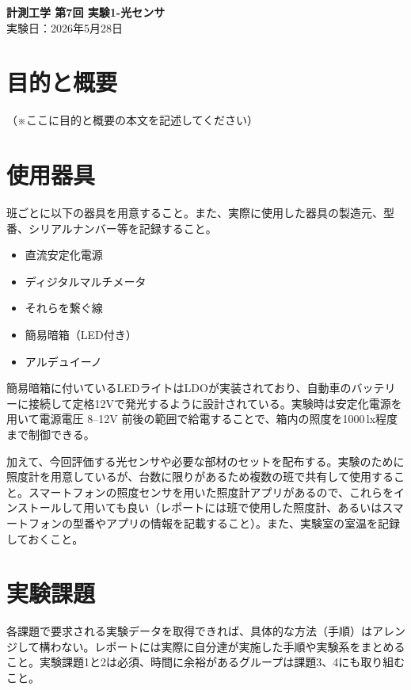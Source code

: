 \documentclass[11pt,a4paper]{jsarticle}
\begin{document}
\begin{center}
    {\LARGE \textbf{計測工学 第7回 実験1-光センサ}} \\
    \vspace{2mm}
    {\large 実験日：2026年5月28日}
\end{center}

\vspace{5mm}

\section{目的と概要}
（※ここに目的と概要の本文を記述してください）

\vspace{3mm}

\section{使用器具}
班ごとに以下の器具を用意すること。また、実際に使用した器具の製造元、型番、シリアルナンバー等を記録すること。

\begin{itemize}
    \item 直流安定化電源
    \item ディジタルマルチメータ
    \item それらを繋ぐ線
    \item 簡易暗箱（LED付き）
    \item アルデュイーノ
\end{itemize}

簡易暗箱に付いているLEDライトはLDOが実装されており、自動車のバッテリーに接続して定格12Vで発光するように設計されている。実験時は安定化電源を用いて電源電圧 8--12V 前後の範囲で給電することで、箱内の照度を1000\,lx程度まで制御できる。

加えて、今回評価する光センサや必要な部材のセットを配布する。実験のために照度計を用意しているが、台数に限りがあるため複数の班で共有して使用すること。スマートフォンの照度センサを用いた照度計アプリがあるので、これらをインストールして用いても良い（レポートには班で使用した照度計、あるいはスマートフォンの型番やアプリの情報を記載すること）。また、実験室の室温を記録しておくこと。

\vspace{3mm}

\section{実験課題}
各課題で要求される実験データを取得できれば、具体的な方法（手順）はアレンジして構わない。レポートには実際に自分達が実施した手順や実験系をまとめること。実験課題1と2は必須、時間に余裕があるグループは課題3、4にも取り組むこと。
\end{document}
